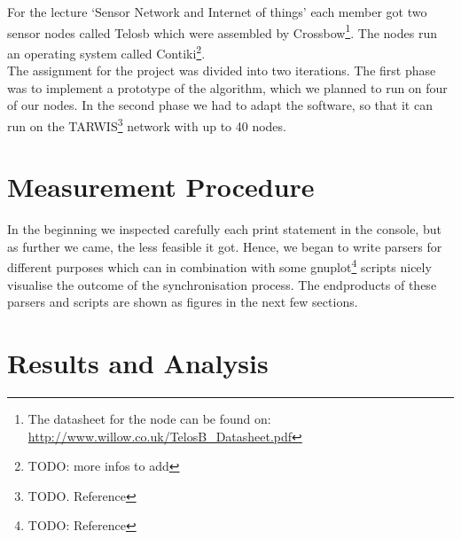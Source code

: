 \documentclass{llncs}
\begin{document}
For the lecture `Sensor Network and Internet of things' each member got two sensor nodes called Telosb which were assembled by Crossbow\footnote{The datasheet for the node can be found on: \url{http://www.willow.co.uk/TelosB_Datasheet.pdf}}. The nodes run an operating system called Contiki\footnote{TODO: more infos to add}.\\
The assignment for the project was divided into two iterations. The first phase was to implement a prototype of the algorithm, which we planned to run on four of our nodes. In the second phase we had to adapt the software, so that it can run on the TARWIS\footnote{TODO. Reference} network with up to 40 nodes.



\section{Measurement Procedure}
In the beginning we inspected carefully each print statement in the console, but as further we came, the less feasible it got. Hence, we began to write parsers for different purposes which can in combination with some gnuplot\footnote{TODO: Reference} scripts nicely visualise the outcome of the synchronisation process. The endproducts of these parsers and scripts are shown as figures in the next few sections.

\section{Results and Analysis}
\end{document}

